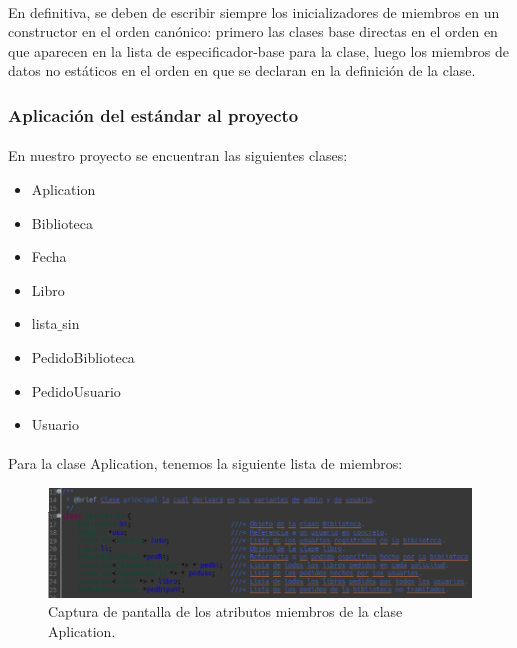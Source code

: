 			\paragraph{}En definitiva, se deben de escribir siempre los inicializadores de miembros en un constructor en el orden canónico: primero las clases base directas en el orden en que aparecen en la lista de especificador-base para la clase, luego los miembros de datos no estáticos en el orden en que se declaran en la definición de la clase.
		
		\subsubsection{Aplicación del estándar al proyecto}
		
			\paragraph{}En nuestro proyecto se encuentran las siguientes clases:
			
			\begin{itemize}
				\item Aplication
				\item Biblioteca
				\item Fecha
				\item Libro
				\item lista$\_$sin
				\item PedidoBiblioteca
				\item PedidoUsuario
				\item Usuario
			\end{itemize}
		
			\paragraph{}Para la clase Aplication, tenemos la siguiente lista de miembros:
			
			\begin{figure}[H]
				\centering
				\includegraphics[scale=0.55]{img/captura2.png}
				\caption{Captura de pantalla de los atributos miembros de la clase Aplication.}
				\label{captura2}
			\end{figure}
		
